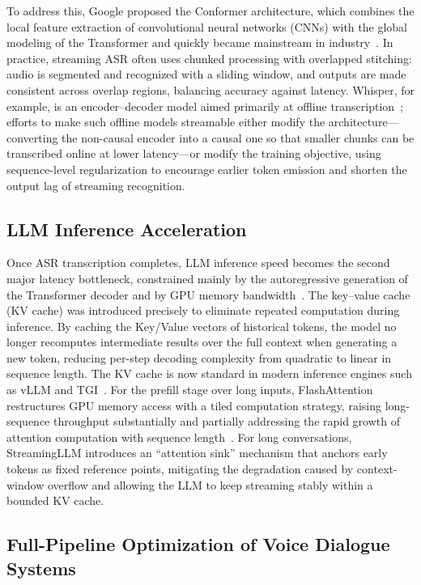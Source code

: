 \documentclass[pdflatex,iicol,Numbered,sn-basic]{sn-jnl}%
\begin{document}
To address this, Google proposed the Conformer architecture, which combines the local feature extraction of convolutional neural networks (CNNs) with the global modeling of the Transformer and quickly became mainstream in industry~\cite{ref5}. In practice, streaming ASR often uses chunked processing with overlapped stitching: audio is segmented and recognized with a sliding window, and outputs are made consistent across overlap regions, balancing accuracy against latency. Whisper, for example, is an encoder--decoder model aimed primarily at offline transcription~\cite{ref6}; efforts to make such offline models streamable either modify the architecture---converting the non-causal encoder into a causal one so that smaller chunks can be transcribed online at lower latency---or modify the training objective, using sequence-level regularization to encourage earlier token emission and shorten the output lag of streaming recognition.

\subsection{LLM Inference Acceleration}

Once ASR transcription completes, LLM inference speed becomes the second major latency bottleneck, constrained mainly by the autoregressive generation of the Transformer decoder and by GPU memory bandwidth~\cite{ref7}. The key--value cache (KV cache) was introduced precisely to eliminate repeated computation during inference. By caching the Key/Value vectors of historical tokens, the model no longer recomputes intermediate results over the full context when generating a new token, reducing per-step decoding complexity from quadratic to linear in sequence length. The KV cache is now standard in modern inference engines such as vLLM and TGI~\cite{ref8}. For the prefill stage over long inputs, FlashAttention restructures GPU memory access with a tiled computation strategy, raising long-sequence throughput substantially and partially addressing the rapid growth of attention computation with sequence length~\cite{ref9}. For long conversations, StreamingLLM introduces an ``attention sink'' mechanism that anchors early tokens as fixed reference points, mitigating the degradation caused by context-window overflow and allowing the LLM to keep streaming stably within a bounded KV cache.

\subsection{Full-Pipeline Optimization of Voice Dialogue Systems}
\end{document}
